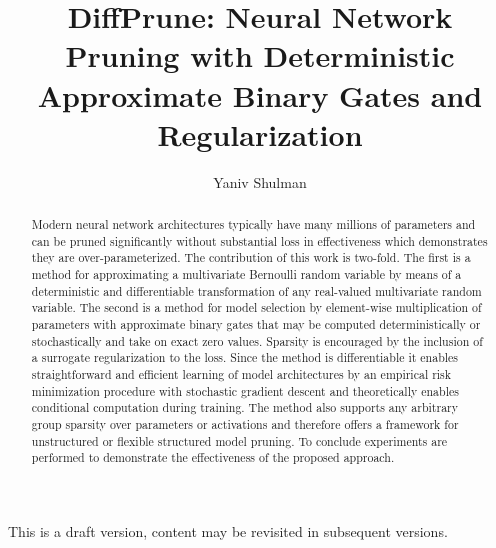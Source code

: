 \documentclass[final,1p,times]{elsarticle}
\begin{document}
\begin{frontmatter}

\vspace*{\fill}
\begin{center}
This is a draft version, content may be revisited in subsequent versions.
\end{center}
\vspace*{\fill}
    
\title{DiffPrune: Neural Network Pruning with Deterministic Approximate Binary Gates and  Regularization}
\author{Yaniv Shulman}
\address{yaniv@aleph-zero.info}


\begin{abstract}
Modern neural network architectures typically have many millions of parameters and can be pruned significantly without substantial loss in effectiveness which demonstrates they are over-parameterized. The contribution of this work is two-fold. The first is a method for approximating a multivariate Bernoulli random variable by means of a deterministic and differentiable transformation of any real-valued multivariate random variable. The second is a method for model selection by element-wise multiplication of parameters with approximate binary gates that may be computed deterministically or stochastically and take on exact zero values. Sparsity is encouraged by the inclusion of a surrogate regularization to the  loss. Since the method is differentiable it enables straightforward and efficient learning of model architectures by an empirical risk minimization procedure with stochastic gradient descent and theoretically enables conditional computation during training. The method also supports any arbitrary group sparsity over parameters or activations and therefore offers a framework for unstructured or flexible structured model pruning. To conclude experiments are performed to demonstrate the effectiveness of the proposed approach.

\end{abstract}
\end{frontmatter}
\end{document}
